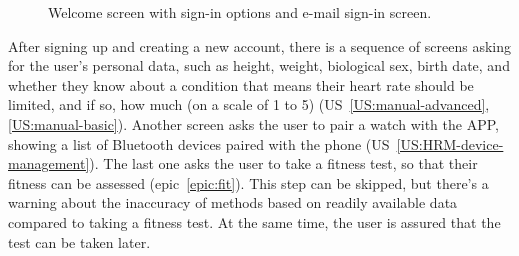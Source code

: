 \begin{figure}[h!]
    \centering
    \hfill
    \caption{Welcome screen with sign-in options and e-mail sign-in screen.}
    \label{fig:sign-in-email}
\end{figure}

After signing up and creating a new account, there is a sequence of screens asking for the user's personal data, such as height, weight, biological sex, birth date, and whether they know about a condition that means their heart rate should be limited, and if so, how much (on a scale of 1 to 5) (US~\ref{US:manual-advanced}, \ref{US:manual-basic}).
Another screen asks the user to pair a watch with the APP, showing a list of Bluetooth devices paired with the phone (US~\ref{US:HRM-device-management}).
The last one asks the user to take a fitness test, so that their fitness can be assessed (epic~\ref{epic:fit}).
This step can be skipped, but there's a warning about the inaccuracy of methods based on readily available data compared to taking a fitness test.
At the same time, the user is assured that the test can be taken later.

